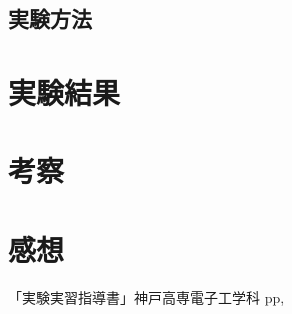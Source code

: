 \documentclass[11pt]{jarticle}
\begin{document}
	\subsection{実験方法}
\section{実験結果}
\section{考察}
\section{感想}
\begin{thebibliography}{99}
「実験実習指導書」神戸高専電子工学科 pp,
\end{thebibliography}
\end{document}
